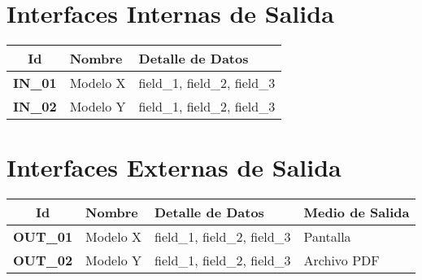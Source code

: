 \section{Interfaces Internas de Salida}

\begin{center}
	\begin{tabular}{ | c | p{3.5cm} | p{10cm} |}
		\hline
		\textbf{Id} & {\textbf{Nombre}} & {\textbf{Detalle de Datos}} \\ \hline
		{\textbf{IN\_01}} & Modelo X & field\_1, field\_2, field\_3 \\ \hline
		{\textbf{IN\_02}} & Modelo Y &  field\_1, field\_2, field\_3 \\ \hline
	\end{tabular}

    \label{table:interfaces:in}
\end{center}

\section{Interfaces Externas de Salida}

\begin{center}
	\begin{tabular}{ | c | p{2cm} | p{6.5cm} | p{4cm} |}
		\hline
		{\textbf{Id}} & 	{\textbf{Nombre}} & {\textbf{Detalle de Datos}} & {\textbf{Medio de Salida}} \\
		\hline
		{\textbf{OUT\_01}} & Modelo X & field\_1, field\_2, field\_3 & Pantalla \\ \hline
		{\textbf{OUT\_02}} & Modelo Y & field\_1, field\_2, field\_3 & Archivo PDF \\ \hline
	\end{tabular}
  
  \label{table:interfaces:out}
\end{center}
